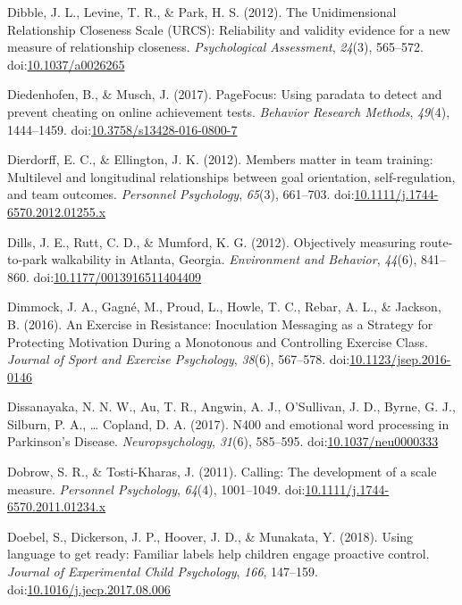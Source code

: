 \documentclass[english,man]{apa6}
\theoremstyle{definition}
\theoremstyle{definition}
\theoremstyle{definition}
\theoremstyle{remark}
\begin{document}
\hypertarget{ref-Dibble2012}{}
Dibble, J. L., Levine, T. R., \& Park, H. S. (2012). The Unidimensional
Relationship Closeness Scale (URCS): Reliability and validity evidence
for a new measure of relationship closeness. \emph{Psychological
Assessment}, \emph{24}(3), 565--572.
doi:\href{https://doi.org/10.1037/a0026265}{10.1037/a0026265}

\hypertarget{ref-Diedenhofen2017}{}
Diedenhofen, B., \& Musch, J. (2017). PageFocus: Using paradata to
detect and prevent cheating on online achievement tests. \emph{Behavior
Research Methods}, \emph{49}(4), 1444--1459.
doi:\href{https://doi.org/10.3758/s13428-016-0800-7}{10.3758/s13428-016-0800-7}

\hypertarget{ref-Dierdorff2012}{}
Dierdorff, E. C., \& Ellington, J. K. (2012). Members matter in team
training: Multilevel and longitudinal relationships between goal
orientation, self-regulation, and team outcomes. \emph{Personnel
Psychology}, \emph{65}(3), 661--703.
doi:\href{https://doi.org/10.1111/j.1744-6570.2012.01255.x}{10.1111/j.1744-6570.2012.01255.x}

\hypertarget{ref-Dills2012}{}
Dills, J. E., Rutt, C. D., \& Mumford, K. G. (2012). Objectively
measuring route-to-park walkability in Atlanta, Georgia.
\emph{Environment and Behavior}, \emph{44}(6), 841--860.
doi:\href{https://doi.org/10.1177/0013916511404409}{10.1177/0013916511404409}

\hypertarget{ref-Dimmock2016}{}
Dimmock, J. A., Gagné, M., Proud, L., Howle, T. C., Rebar, A. L., \&
Jackson, B. (2016). An Exercise in Resistance: Inoculation Messaging as
a Strategy for Protecting Motivation During a Monotonous and Controlling
Exercise Class. \emph{Journal of Sport and Exercise Psychology},
\emph{38}(6), 567--578.
doi:\href{https://doi.org/10.1123/jsep.2016-0146}{10.1123/jsep.2016-0146}

\hypertarget{ref-Dissanayaka2017}{}
Dissanayaka, N. N. W., Au, T. R., Angwin, A. J., O'Sullivan, J. D.,
Byrne, G. J., Silburn, P. A., \ldots{} Copland, D. A. (2017). N400 and
emotional word processing in Parkinson's Disease.
\emph{Neuropsychology}, \emph{31}(6), 585--595.
doi:\href{https://doi.org/10.1037/neu0000333}{10.1037/neu0000333}

\hypertarget{ref-Dobrow2011}{}
Dobrow, S. R., \& Tosti-Kharas, J. (2011). Calling: The development of a
scale measure. \emph{Personnel Psychology}, \emph{64}(4), 1001--1049.
doi:\href{https://doi.org/10.1111/j.1744-6570.2011.01234.x}{10.1111/j.1744-6570.2011.01234.x}

\hypertarget{ref-Doebel2018}{}
Doebel, S., Dickerson, J. P., Hoover, J. D., \& Munakata, Y. (2018).
Using language to get ready: Familiar labels help children engage
proactive control. \emph{Journal of Experimental Child Psychology},
\emph{166}, 147--159.
doi:\href{https://doi.org/10.1016/j.jecp.2017.08.006}{10.1016/j.jecp.2017.08.006}
\end{document}
